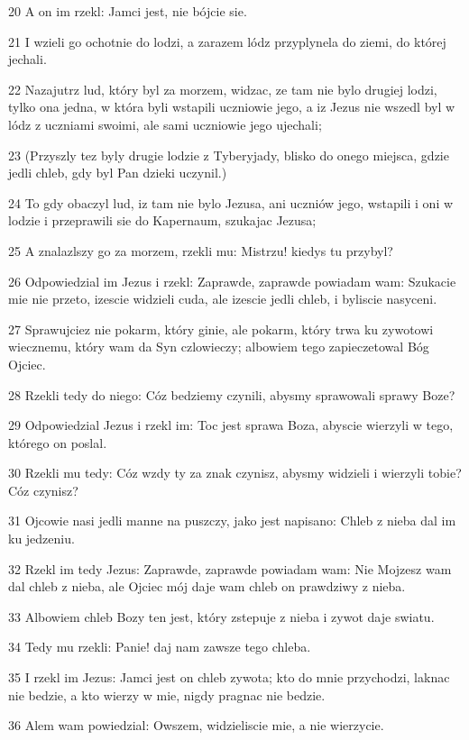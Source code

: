 \par 20 A on im rzekl: Jamci jest, nie bójcie sie.
\par 21 I wzieli go ochotnie do lodzi, a zarazem lódz przyplynela do ziemi, do której jechali.
\par 22 Nazajutrz lud, który byl za morzem, widzac, ze tam nie bylo drugiej lodzi, tylko ona jedna, w która byli wstapili uczniowie jego, a iz Jezus nie wszedl byl w lódz z uczniami swoimi, ale sami uczniowie jego ujechali;
\par 23 (Przyszly tez byly drugie lodzie z Tyberyjady, blisko do onego miejsca, gdzie jedli chleb, gdy byl Pan dzieki uczynil.)
\par 24 To gdy obaczyl lud, iz tam nie bylo Jezusa, ani uczniów jego, wstapili i oni w lodzie i przeprawili sie do Kapernaum, szukajac Jezusa;
\par 25 A znalazlszy go za morzem, rzekli mu: Mistrzu! kiedys tu przybyl?
\par 26 Odpowiedzial im Jezus i rzekl: Zaprawde, zaprawde powiadam wam: Szukacie mie nie przeto, izescie widzieli cuda, ale izescie jedli chleb, i byliscie nasyceni.
\par 27 Sprawujciez nie pokarm, który ginie, ale pokarm, który trwa ku zywotowi wiecznemu, który wam da Syn czlowieczy; albowiem tego zapieczetowal Bóg Ojciec.
\par 28 Rzekli tedy do niego: Cóz bedziemy czynili, abysmy sprawowali sprawy Boze?
\par 29 Odpowiedzial Jezus i rzekl im: Toc jest sprawa Boza, abyscie wierzyli w tego, którego on poslal.
\par 30 Rzekli mu tedy: Cóz wzdy ty za znak czynisz, abysmy widzieli i wierzyli tobie? Cóz czynisz?
\par 31 Ojcowie nasi jedli manne na puszczy, jako jest napisano: Chleb z nieba dal im ku jedzeniu.
\par 32 Rzekl im tedy Jezus: Zaprawde, zaprawde powiadam wam: Nie Mojzesz wam dal chleb z nieba, ale Ojciec mój daje wam chleb on prawdziwy z nieba.
\par 33 Albowiem chleb Bozy ten jest, który zstepuje z nieba i zywot daje swiatu.
\par 34 Tedy mu rzekli: Panie! daj nam zawsze tego chleba.
\par 35 I rzekl im Jezus: Jamci jest on chleb zywota; kto do mnie przychodzi, laknac nie bedzie, a kto wierzy w mie, nigdy pragnac nie bedzie.
\par 36 Alem wam powiedzial: Owszem, widzieliscie mie, a nie wierzycie.
